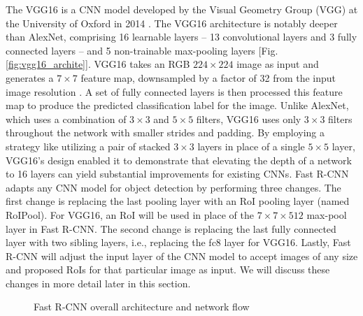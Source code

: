 The VGG16 is a CNN model developed by the Visual Geometry Group (VGG) at the University of Oxford in 2014 \cite{vgg16_2014}. The VGG16 architecture is notably deeper than AlexNet, comprising 16 learnable layers -- 13 convolutional layers and 3 fully connected layers -- and 5 non-trainable max-pooling layers [Fig. \ref{fig:vgg16_archite}]. VGG16 takes an RGB $224 \times 224$ image as input and generates a $7 \times 7$ feature map, downsampled by a factor of 32 from the input image resolution \cite{deconv_rcnn_2018}. A set of fully connected layers is then processed this feature map to produce the predicted classification label for the image. Unlike AlexNet, which uses a combination of $3 \times 3$ and $5 \times 5$ filters, VGG16 uses only $3 \times 3$ filters throughout the network with smaller strides and padding. By employing a strategy like utilizing a pair of stacked $3 \times 3$ layers in place of a single $5 \times 5$ layer, VGG16's design enabled it to demonstrate that elevating the depth of a network to 16 layers can yield substantial improvements for existing CNNs. Fast R-CNN adapts any CNN model for object detection by performing three changes. The first change is replacing the last pooling layer with an RoI pooling layer (named RoIPool). For VGG16, an RoI will be used in place of the $7 \times 7 \times 512$ max-pool layer in Fast R-CNN. The second change is replacing the last fully connected layer with two sibling layers, i.e., replacing the fc8 layer for VGG16. Lastly, Fast R-CNN will adjust the input layer of the CNN model to accept images of any size and proposed RoIs for that particular image as input. We will discuss these changes in more detail later in this section.

\begin{figure}[!ht]
    \centering

    \caption{Fast R-CNN overall architecture and network flow} \label{fig:fast_rcnn_archite_flowc}
\end{figure}

